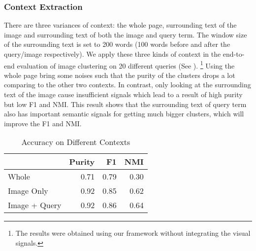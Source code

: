 \subsubsection{Context Extraction}
\label{sec:contexteval}
There are three variances of context: the whole page, surrounding
text of the image and surrounding text of both the image and query term.
The window size of the surrounding text is set to 200 words (100 words 
before and after the query/image respectively).
We apply these three kinds of context in the end-to-end evaluation of
image clustering on 20 different queries (See ).
\footnote{The results were obtained using our framework without
integrating the visual signals.}
Using the whole page bring some noises such that the purity of the clusters
drops a lot comparing to the other two contexts. In contrast, only looking at the
surrounding text of the image cause insufficient signals which lead to
a result of high purity but low F1 and NMI.
This result shows that the surrounding text of query term
also has important semantic signals for getting much bigger clusters,
which will improve the F1 and NMI.

\begin{table}[th]
\centering
\caption{Accuracy on Different Contexts}
\small
\begin{tabular}{|l|r|r|r|}
\hline
     &       {\bf Purity} &         {\bf F1} &        {\bf NMI} \\
\hline
     Whole &       0.71 &       0.79 &       0.30 \\
\hline
Image Only &       0.92 &       0.85 &        0.62  \\
\hline
Image + Query &       0.92 &       0.86 &       0.64 \\
\hline
\end{tabular}
\label{tab:contexteval}
\end{table}

